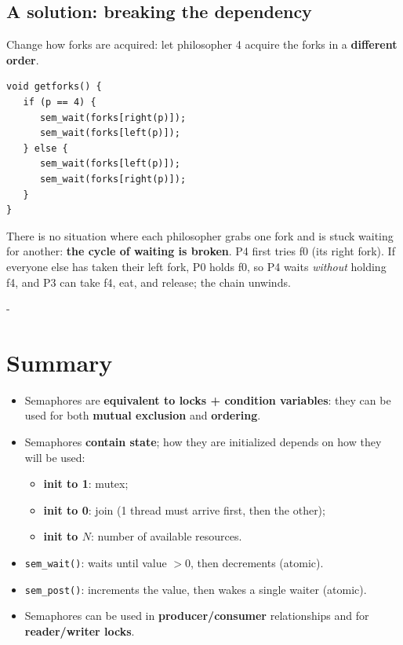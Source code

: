 \documentclass[11pt,a4paper]{article}
\makeatletter
\newcommand{\keepspace}[1]{\par\penalty-100\begingroup
  \setlength{\dimen@}{#1}\dimen@ii\pagegoal\advance\dimen@ii-\pagetotal
  \ifdim\dimen@>\dimen@ii\ifdim\dimen@ii>\z@\vfil\fi\break\fi\endgroup}
\makeatother
\begin{document}
\subsection{A solution: breaking the dependency}

Change how forks are acquired: let philosopher 4 acquire the forks in a
\textbf{different order}.

\begin{lstlisting}
void getforks() {
   if (p == 4) {
      sem_wait(forks[right(p)]);
      sem_wait(forks[left(p)]);
   } else {
      sem_wait(forks[left(p)]);
      sem_wait(forks[right(p)]);
   }
}
\end{lstlisting}

There is no situation where each philosopher grabs one fork and is stuck
waiting for another: \textbf{the cycle of waiting is broken}. P4 first
tries f0 (its right fork). If everyone else has taken their left fork, P0
holds f0, so P4 waits \emph{without} holding f4, and P3 can take f4, eat,
and release; the chain unwinds.

\keepspace{22\baselineskip}
\section{Summary}

\begin{keybox}[Semaphores]
\begin{itemize}
  \item Semaphores are \textbf{equivalent to locks + condition variables}:
        they can be used for both \textbf{mutual exclusion} and
        \textbf{ordering}.
  \item Semaphores \textbf{contain state}; how they are initialized depends
        on how they will be used:
    \begin{itemize}
      \item \textbf{init to 1}: mutex;
      \item \textbf{init to 0}: join (1 thread must arrive first, then the
            other);
      \item \textbf{init to \(N\)}: number of available resources.
    \end{itemize}
  \item \texttt{sem\_wait()}: waits until value \(> 0\), then decrements
        (atomic).
  \item \texttt{sem\_post()}: increments the value, then wakes a single
        waiter (atomic).
  \item Semaphores can be used in \textbf{producer/consumer} relationships
        and for \textbf{reader/writer locks}.
\end{itemize}
\end{keybox}
\end{document}
